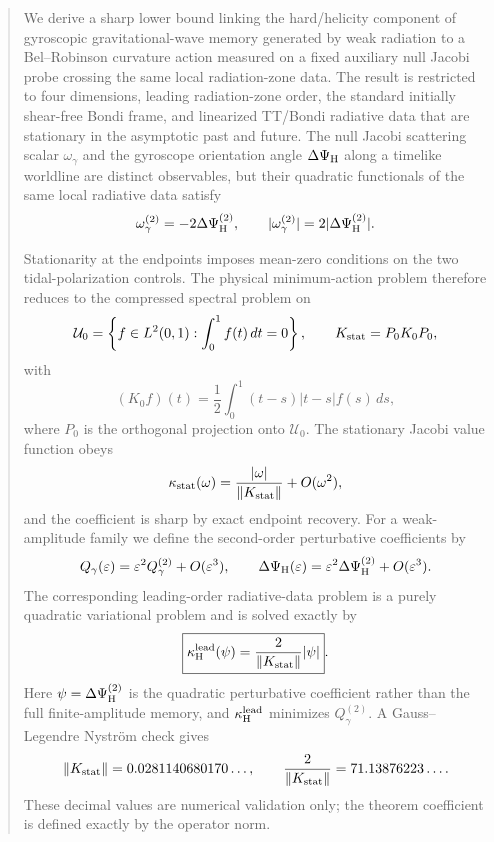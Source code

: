 \begin{abstract}
We derive a sharp lower bound linking the hard/helicity component of gyroscopic gravitational-wave memory generated by weak radiation to a Bel--Robinson curvature action measured on a fixed auxiliary null Jacobi probe crossing the same local radiation-zone data. The result is restricted to four dimensions, leading radiation-zone order, the standard initially shear-free Bondi frame, and linearized TT/Bondi radiative data that are stationary in the asymptotic past and future. The null Jacobi scattering scalar $\omega_\gamma$ and the gyroscope orientation angle $\Delta\Psi_{\rm H}$ along a timelike worldline are distinct observables, but their quadratic functionals of the same local radiative data satisfy
\[
\omega_\gamma^{(2)}=-2\Delta\Psi_{\rm H}^{(2)},\qquad
|\omega_\gamma^{(2)}|=2|\Delta\Psi_{\rm H}^{(2)}|.
\]

Stationarity at the endpoints imposes mean-zero conditions on the two tidal-polarization controls. The physical minimum-action problem therefore reduces to the compressed spectral problem on
\[
\mathcal U_0=\left\{f\in L^2(0,1):\int_0^1 f(t)\,dt=0\right\},\qquad
K_{\rm stat}=P_0K_0P_0,
\]
with
\[
(K_0f)(t)=\frac12\int_0^1(t-s)|t-s|f(s)\,ds,
\]
where $P_0$ is the orthogonal projection onto $\mathcal U_0$. The stationary Jacobi value function obeys
\[
\kappa_{\rm stat}(\omega)=\frac{|\omega|}{\|K_{\rm stat}\|}+O(\omega^2),
\]
and the coefficient is sharp by exact endpoint recovery. For a weak-amplitude family we define the second-order perturbative coefficients by
\[
Q_\gamma(\eps)=\eps^2Q_\gamma^{(2)}+O(\eps^3),\qquad
\Delta\Psi_{\rm H}(\eps)=\eps^2\Delta\Psi_{\rm H}^{(2)}+O(\eps^3).
\]
The corresponding leading-order radiative-data problem is a purely quadratic variational problem and is solved exactly by
\[
\boxed{\kappa_{\rm H}^{\rm lead}(\psi)=\frac{2}{\|K_{\rm stat}\|}|\psi|}.
\]
Here $\psi=\Delta\Psi_{\rm H}^{(2)}$ is the quadratic perturbative coefficient rather than the full finite-amplitude memory, and $\kappa_{\rm H}^{\rm lead}$ minimizes $Q_\gamma^{(2)}$. A Gauss--Legendre Nystr\"om check gives
\[
\|K_{\rm stat}\|=0.0281140680170\ldots,\qquad
\frac{2}{\|K_{\rm stat}\|}=71.13876223\ldots.
\]
These decimal values are numerical validation only; the theorem coefficient is defined exactly by the operator norm.


\end{abstract}
